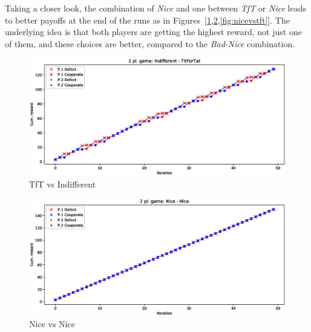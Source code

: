 \documentclass[journal,10pt,twoside]{IEEEtran}
\begin{document}
Taking a closer look, the combination of \textit{Nice} and one between \textit{TfT} or \textit{Nice} leads to better payoffs at the end of the runs as in Figures~[\ref{fig:tftvsindiff},\ref{fig:nicevsnice},\ref{fig:nicevstft}]. The underlying idea is that both players are getting the highest reward, not just one of them, and these choices are better, compared to the \textit{Bad}-\textit{Nice} combination.

\begin{figure}[!ht]
    \centering
    \includegraphics[width=1\columnwidth]{../img/ipd2p/ipd2p-rewards-Indifferent-TitForTat}
    \caption{TfT vs Indifferent}
    \label{fig:tftvsindiff}
\end{figure}

\begin{figure}[!ht]
    \centering
    \includegraphics[width=1\columnwidth]{../img/ipd2p/ipd2p-rewards-Nice-Nice}
    \caption{Nice vs Nice}
    \label{fig:nicevsnice}
\end{figure}
\end{document}
